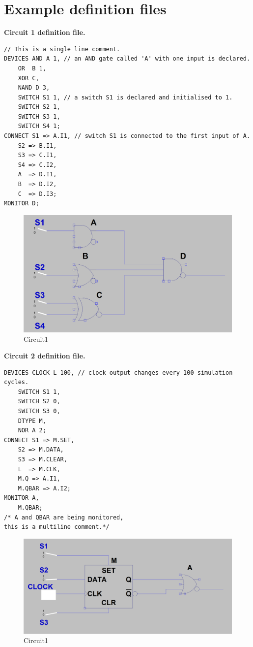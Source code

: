 \documentclass[12pt]{article}
\def\n{\noindent}
\begin{document}
\section{Example definition files}
\textbf{Circuit 1 definition file.}\\
\begin{lstlisting}[basicstyle=\small]
// This is a single line comment.
DEVICES AND A 1, // an AND gate called 'A' with one input is declared.
	OR  B 1,
	XOR C,
	NAND D 3,
	SWITCH S1 1, // a switch S1 is declared and initialised to 1.
	SWITCH S2 1,
	SWITCH S3 1,
	SWITCH S4 1;
CONNECT S1 => A.I1, // switch S1 is connected to the first input of A.
	S2 => B.I1,
	S3 => C.I1,
	S4 => C.I2,
	A  => D.I1,
	B  => D.I2,
	C  => D.I3;
MONITOR D;
\end{lstlisting}
\begin{figure}[H]
  \centering
  \includegraphics[width=0.8\linewidth]{circuit1.png}
  \caption{Circuit1}
  \label{fig:1}
\end{figure}

\newpage
\n\textbf{Circuit 2 definition file.}
\begin{lstlisting}[basicstyle=\small]
DEVICES CLOCK L 100, // clock output changes every 100 simulation cycles.
	SWITCH S1 1,
	SWITCH S2 0,
	SWITCH S3 0,
	DTYPE M,
	NOR A 2;
CONNECT S1 => M.SET,
	S2 => M.DATA,
	S3 => M.CLEAR,
	L  => M.CLK,
	M.Q => A.I1,
	M.QBAR => A.I2;
MONITOR A,
	M.QBAR;
/* A and QBAR are being monitored,
this is a multiline comment.*/
\end{lstlisting}
\begin{figure}[H]
  \centering
  \includegraphics[width=0.8\linewidth]{circuit2.png}
  \caption{Circuit1}
  \label{fig:2}
\end{figure}
\end{document}
